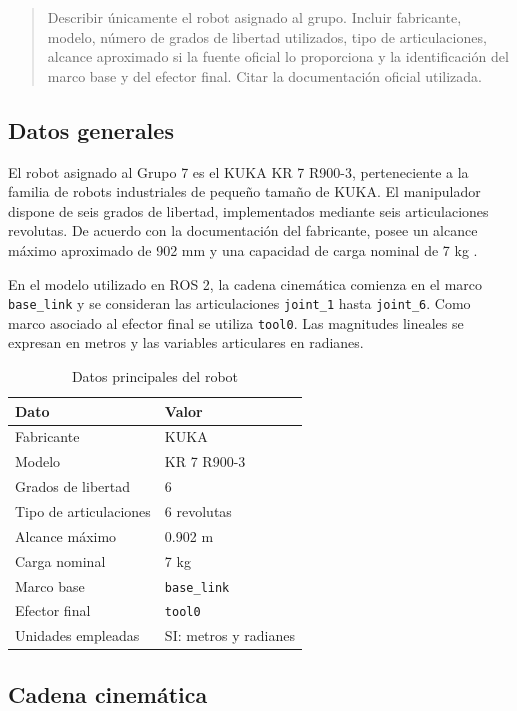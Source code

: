 \documentclass[journal]{IEEEtran}
\newcommand{\instr}[1]{%
\begin{quote}
\small
\noindent\textbf{\color{blue}{INSTRUCCIÓN:}} #1
\end{quote}
}
\begin{document}
\instr{Describir únicamente el robot asignado al grupo. Incluir fabricante, modelo, número de grados de libertad utilizados, tipo de articulaciones, alcance aproximado si la fuente oficial lo proporciona y la identificación del marco base y del efector final. Citar la documentación oficial utilizada.}

\subsection{Datos generales}

El robot asignado al Grupo 7 es el KUKA KR 7 R900-3,
perteneciente a la familia de robots industriales de pequeño
tamaño de KUKA. El manipulador dispone de seis grados de
libertad, implementados mediante seis articulaciones revolutas.
De acuerdo con la documentación del fabricante, posee un
alcance máximo aproximado de 902 mm y una capacidad de carga
nominal de 7 kg \cite{robot_docs}.

En el modelo utilizado en ROS 2, la cadena cinemática comienza
en el marco \texttt{base\_link} y se consideran las articulaciones
\texttt{joint\_1} hasta \texttt{joint\_6}. Como marco asociado al
efector final se utiliza \texttt{tool0}. Las magnitudes lineales
se expresan en metros y las variables articulares en radianes.

\begin{table}[H]
\centering
\caption{Datos principales del robot}
\begin{tabular}{ll}
\toprule
\textbf{Dato} & \textbf{Valor} \\
\midrule
Fabricante & KUKA \\
Modelo & KR 7 R900-3 \\
Grados de libertad & 6 \\
Tipo de articulaciones & 6 revolutas \\
Alcance máximo & 0.902 m \\
Carga nominal & 7 kg \\
Marco base & \texttt{base\_link} \\
Efector final & \texttt{tool0} \\
Unidades empleadas & SI: metros y radianes \\
\bottomrule
\end{tabular}
\end{table}

\subsection{Cadena cinemática}
\end{document}
